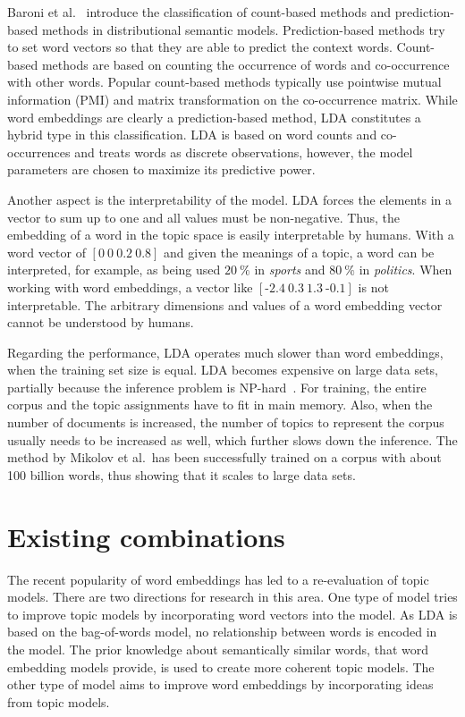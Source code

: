 \documentclass[
        a4paper,
        titlepage,
        twoside,
        parskip,
        numbers=noenddot
        ]{scrbook}
\theoremstyle{break}
\begin{document}
Baroni et al.~\cite{Baroni2014} introduce the classification of count-based methods and prediction-based methods in distributional semantic models.
Prediction-based methods try to set word vectors so that they are able to predict the context words.
Count-based methods are based on counting the occurrence of words and co-occurrence with other words.
Popular count-based methods typically use pointwise mutual information (PMI) and matrix transformation on the co-occurrence matrix.
While word embeddings are clearly a prediction-based method, LDA constitutes a hybrid type in this classification.
LDA is based on word counts and co-occurrences and treats words as discrete observations, however, the model parameters are chosen to maximize its predictive power.

Another aspect is the interpretability of the model.
LDA forces the elements in a vector to sum up to one and all values must be non-negative.
Thus, the embedding of a word in the topic space is easily interpretable by humans.
With a word vector of $[0~0~0.2~0.8]$ and given the meanings of a topic, a word can be interpreted, for example, as being used $20~\%$ in \emph{sports} and $80~\%$ in \emph{politics}.
When working with word embeddings, a vector like $[{\text{-}2.4}~0.3~1.3~{\text{-}0.1}]$ is not interpretable.
The arbitrary dimensions and values of a word embedding vector cannot be understood by humans.

Regarding the performance, LDA operates much slower than word embeddings, when the training set size is equal.
LDA becomes expensive on large data sets, partially because the inference problem is NP-hard~\cite{Sontag2011a}.
For training, the entire corpus and the topic assignments have to fit in main memory.
Also, when the number of documents is increased, the number of topics to represent the corpus usually needs to be increased as well, which further slows down the inference.
The method by Mikolov et al.\ has been successfully trained on a corpus with about 100 billion words, thus showing that it scales to large data sets.

\section{Existing combinations}
The recent popularity of word embeddings has led to a re-evaluation of topic models.
There are two directions for research in this area.
One type of model tries to improve topic models by incorporating word vectors into the model.
As LDA is based on the bag-of-words model, no relationship between words is encoded in the model.
The prior knowledge about semantically similar words, that word embedding models provide, is used to create more coherent topic models.
The other type of model aims to improve word embeddings by incorporating ideas from topic models.
\end{document}
